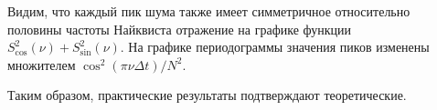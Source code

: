 \documentclass[12pt]{article}
\begin{document}
\vspace{10pt}
\begin{minipage}[h]{\linewidth}
\end{minipage}

\vspace{10pt}
\begin{minipage}[h]{\linewidth}
\end{minipage}

\vspace{\baselineskip}

Видим, что каждый пик шума также имеет симметричное относительно половины частоты Найквиста отражение на графике функции $ S_{\cos}^2(\nu) + S_{\sin}^2(\nu) $. На графике периодограммы значения пиков изменены множителем $ \cos^2(\pi \nu \Delta t) / N^2 $. \par

\vspace{\baselineskip}

Таким образом, практические результаты подтверждают теоретические.
\end{document}
